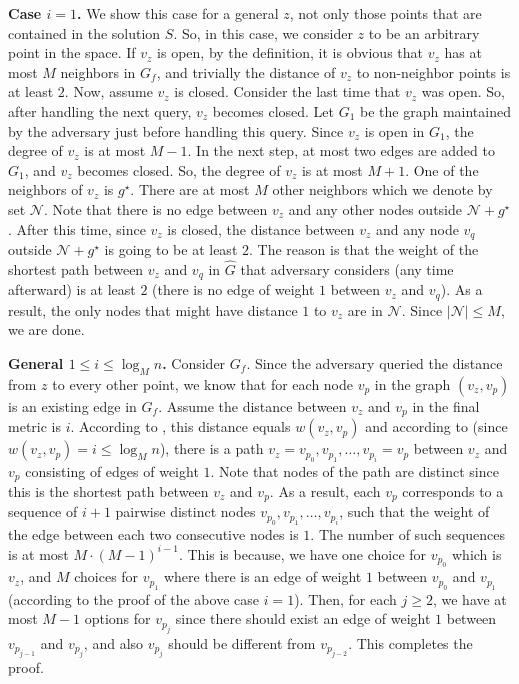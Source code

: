 \documentclass[11pt]{article}
\newcommand{\1}{\mathmybb{1}}
\begin{document}
\medskip
\noindent \textbf{Case $i=1$.} We show this case for a general $z$, not only those points that are contained in the solution $S$. So, in this case, we consider $z$ to be an arbitrary point in the space.
If $v_z$ is open, by the definition, it is obvious that $v_z$ has at most $M$ neighbors in $G_f$, and trivially the distance of $v_z$ to non-neighbor points is at least $2$.
Now, assume $v_z$ is closed. 
Consider the last time that $v_z$ was open.
So, after handling the next query, $v_z$ becomes closed.
Let $G_1$ be the graph maintained by the adversary just before handling this query.
Since $v_z$ is open in $G_1$, the degree of $v_z$ is at most $M-1$.
In the next step, at most two edges are added to $G_1$, and $v_z$ becomes closed.
So, the degree of $v_z$ is at most $M+1$.
One of the neighbors of $v_z$ is $g^\star$.
There are at most $M$ other neighbors which we denote by set $\mathcal{N}$.
Note that there is no edge between $v_z$ and any other nodes outside $\mathcal{N} + g^\star$.
After this time, since $v_z$ is closed, the distance between $v_z$ and any node $v_q$ outside $\mathcal{N}+g^\star$ is going to be at least $2$.
The reason is that the weight of the shortest path between $v_z$ and $v_q$ in $\widehat G$ that adversary considers (any time afterward) is at least $2$ (there is no edge of weight $1$ between $v_z$ and $v_q$).
As a result, the only nodes that might have distance $1$ to $v_z$ are in $\mathcal{N}$.
Since $|\mathcal{N}| \leq M$, we are done.

\medskip
\noindent \textbf{General $1 \leq i \leq \log_M n$.}
Consider $G_f$. Since the adversary queried the distance from $z$ to every other point, we know that for each node $v_p$ in the graph $(v_z,v_p)$ is an existing edge in $G_f$.
Assume the distance between $v_z$ and $v_p$ in the final metric is $i$.
According to , this distance equals $w(v_z,v_p)$ and according to  (since $w(v_z,v_p) = i \leq \log_M n$), there is a path $v_z = v_{p_0}, v_{p_1}, \ldots , v_{p_{i}} = v_p$ between $v_z$ and $v_p$ consisting of edges of weight $1$.
Note that nodes of the path are distinct since this is the shortest path between $v_z$ and $v_p$.
As a result, each $v_p$ corresponds to a sequence of $i+1$ pairwise distinct nodes $v_{p_0}, v_{p_1},\ldots, v_{p_i}$, such that the weight of the edge between each two consecutive nodes is $1$.
The number of such sequences is at most $M\cdot (M-1)^{i-1}$.
This is because, we have one choice for $v_{p_0}$ which is $v_z$, and $M$ choices for $v_{p_1}$ where there is an edge of weight $1$ between $v_{p_0}$ and $v_{p_1}$ (according to the proof of the above case $i=1$).
Then, for each $j \geq 2$, we have at most $M-1$ options for $v_{p_j}$ since there should exist an edge of weight $1$ between $v_{p_{j-1}}$ and $v_{p_j}$, and also $v_{p_j}$ should be different from $v_{p_{j-2}}$.
This completes the proof. 
\end{document}
